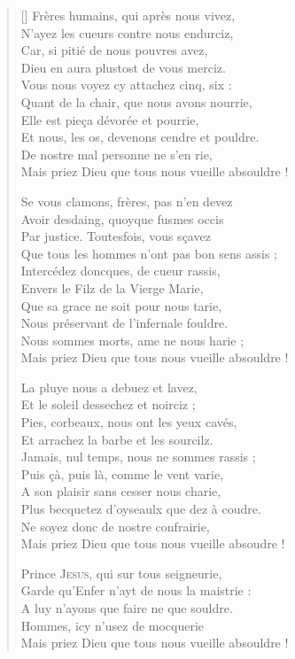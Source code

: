 \documentclass[11pt,a4paper,french]{scrartcl}
\begin{document}
\begin{verse}[\versewidth]
\vin Frères humains, qui après nous vivez,\\
N'ayez les cueurs contre nous endurciz,\\
Car, si pitié de nous pouvres avez,\\
Dieu en aura plustost de vous merciz.\\
Vous nous voyez cy attachez cinq, six :\\
Quant de la chair, que nous avons nourrie,\\
Elle est pieça dévorée et pourrie,\\
Et nous, les os, devenons cendre et pouldre.\\
De nostre mal personne ne s'en rie,\\
Mais priez Dieu que tous nous vueille absouldre !

\vin Se vous clamons, frères, pas n'en devez\\
Avoir desdaing, quoyque fusmes occis\\
Par justice. Toutesfois, vous sçavez\\
Que tous les hommes n'ont pas bon sens assis ;\\
Intercédez doncques, de cueur rassis,\\
Envers le Filz de la Vierge Marie,\\
Que sa grace ne soit pour nous tarie,\\
Nous préservant de l'infernale fouldre.\\
Nous sommes morts, ame ne nous harie ;\\
Mais priez Dieu que tous nous vueille absouldre !

\vin La pluye nous a debuez et lavez,\\
Et le soleil dessechez et noirciz ;\\
Pies, corbeaux, nous ont les yeux cavés,\\
Et arrachez la barbe et les sourcilz.\\
Jamais, nul temps, nous ne sommes rassis ;\\
Puis çà, puis là, comme le vent varie,\\
A son plaisir sans cesser nous charie,\\
Plus becquetez d'oyseaulx que dez à coudre.\\
Ne soyez donc de nostre confrairie,\\
Mais priez Dieu que tous nous vueille absoudre !

\hspace{0.5\versewidth}{\poemtitlefont\small%
ENVOI.
}%

\vin Prince \textsc{Jesus}, qui sur tous seigneurie,\\
Garde qu'Enfer n'ayt de nous la maistrie :\\
A luy n'ayons que faire ne que souldre.\\
Hommes, icy n'usez de mocquerie\\
Mais priez Dieu que tous nous vueille absouldre !
\end{verse}

\end{document}
